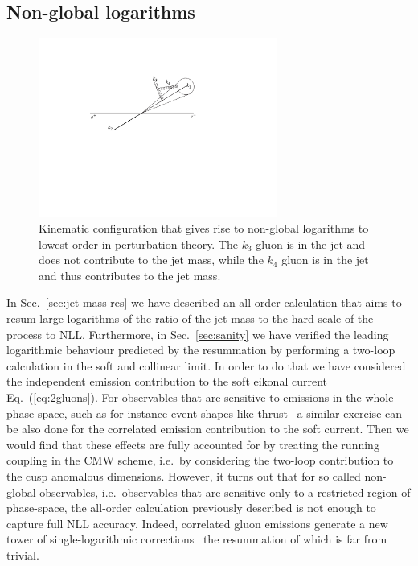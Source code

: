 \subsection{Non-global logarithms}\label{sec:non-global}
\begin{figure}[tb]
  \begin{center}
\includegraphics[width=0.7\textwidth]{figures/ngjet}
\caption{Kinematic configuration that gives rise to non-global
  logarithms to lowest order in perturbation theory. The $k_3$ gluon
  is in the jet and does not contribute to the jet mass, while the
  $k_4$ gluon is in the jet and thus contributes to the jet mass.}
    \label{fig:non-globalcontribution}
  \end{center}
\end{figure}
In Sec.~\ref{sec:jet-mass-res} we have described an all-order calculation that aims to resum large logarithms of the ratio of the jet mass to the hard scale of the process to NLL. Furthermore, in Sec.~\ref{sec:sanity} we have verified the leading logarithmic behaviour predicted by the resummation by performing a two-loop calculation in the soft and collinear limit. 
%
In order to do that we have considered the independent emission contribution to the soft eikonal current Eq.~(\ref{eq:2gluons}).
%
For observables that are sensitive to emissions in the whole phase-space, such as for instance event shapes like thrust~\cite{Farhi:1977sg} a similar exercise can be also done for the correlated emission contribution to the soft current. Then we would find that these effects are fully accounted for by treating the running coupling in the CMW scheme, i.e.\ by considering the two-loop contribution to the cusp anomalous dimensions.
%
However, it turns out that for so called non-global observables, i.e.\ observables that are sensitive only to a restricted region of phase-space, the all-order calculation previously described is not enough to capture full NLL accuracy. Indeed, correlated gluon emissions generate a new tower of single-logarithmic corrections~\cite{Dasgupta:2001sh,Dasgupta:2002bw}  the resummation of which is far from trivial.

